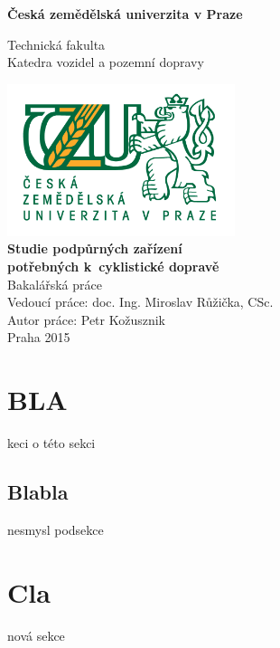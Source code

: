 \documentclass[a4paper,11pt]{article}
\begin{document}
\begin{titlepage}
    \begin{center}
        
        \textbf{Česká zemědělská univerzita v Praze}
        
        \vspace{0.5cm}
        Technická fakulta\\
        \vspace{0.5cm}
        Katedra vozidel a pozemní dopravy\\

        
        \vspace{0.8cm}
        
        \includegraphics[width=0.5\textwidth]{./logo}
        \vspace{1cm}\\
       \textbf{\LARGE Studie podpůrných zařízení\\
        potřebných k~cyklistické dopravě\\}
        \vspace{1cm}
        Bakalářská práce\\
        
        \vfill              
	    Vedoucí práce: doc. Ing. Miroslav Růžička, CSc.\\
        \vspace{0.5cm}
        Autor práce: Petr Kožusznik\\ 
        \vspace{0.5cm}
        Praha 2015\\
        
    \end{center}
\end{titlepage}

\tableofcontents
\newpage

\section{BLA}
keci o této sekci
	\subsection{Blabla}
	nesmysl podsekce	
\section{Cla}
nová sekce
	
\end{document}
